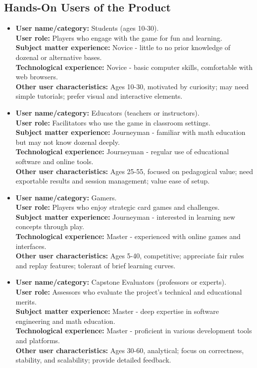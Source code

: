 \documentclass[12pt]{article}
\begin{document}
\subsection{Hands-On Users of the Product}
\begin{itemize}
  \item \textbf{User name/category:} Students (ages 10-30). \\
  \textbf{User role:} Players who engage with the game for fun and learning. \\
  \textbf{Subject matter experience:} Novice - little to no prior knowledge of dozenal or alternative bases. \\
  \textbf{Technological experience:} Novice - basic computer skills, comfortable with web browsers. \\
  \textbf{Other user characteristics:} Ages 10-30, motivated by curiosity; may need simple tutorials; prefer visual and interactive elements.
  
  \item \textbf{User name/category:} Educators (teachers or instructors). \\
  \textbf{User role:} Facilitators who use the game in classroom settings. \\
  \textbf{Subject matter experience:} Journeyman - familiar with math education but may not know dozenal deeply. \\
  \textbf{Technological experience:} Journeyman - regular use of educational software and online tools. \\
  \textbf{Other user characteristics:} Ages 25-55, focused on pedagogical value; need exportable results and session management; value ease of setup.
  
  \item \textbf{User name/category:} Gamers. \\
  \textbf{User role:} Players who enjoy strategic card games and challenges. \\
  \textbf{Subject matter experience:} Journeyman - interested in learning new concepts through play. \\
  \textbf{Technological experience:} Master - experienced with online games and interfaces. \\
  \textbf{Other user characteristics:} Ages 5-40, competitive; appreciate fair rules and replay features; tolerant of brief learning curves.
  
  \item \textbf{User name/category:} Capstone Evaluators (professors or experts). \\
  \textbf{User role:} Assessors who evaluate the project's technical and educational merits. \\
  \textbf{Subject matter experience:} Master - deep expertise in software engineering and math education. \\
  \textbf{Technological experience:} Master - proficient in various development tools and platforms. \\
  \textbf{Other user characteristics:} Ages 30-60, analytical; focus on correctness, stability, and scalability; provide detailed feedback.
  

\end{itemize}
\end{document}
